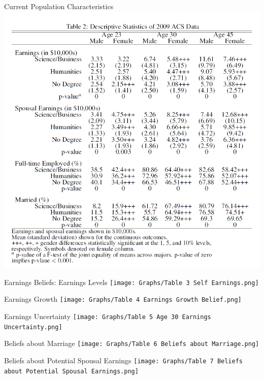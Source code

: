 \documentclass[12pt]{beamer}
\begin{document}
\begin{frame}{Current Population Characteristics}
    \includegraphics[scale=0.4]{Table2.png}
\end{frame}

\begin{frame}{Earnings Beliefs: Earnings Levels}
    \texttt{[image: Graphs/Table 3 Self Earnings.png]}
\end{frame}

\begin{frame}{Earnings Growth}
    \texttt{[image: Graphs/Table 4 Earnings Growth Belief.png]}
\end{frame}

\begin{frame}{Earnings Uncertainty}
    \texttt{[image: Graphs/Table 5 Age 30 Earnings Uncertainty.png]}
\end{frame}

\begin{frame}{Beliefs about Marriage}
    \texttt{[image: Graphs/Table 6 Beliefs about Marriage.png]}
\end{frame}

\begin{frame}{Beliefs about Potential Spousal Earnings}
    \texttt{[image: Graphs/Table 7 Beliefs about Potential Spousal Earnings.png]}
\end{frame}
\end{document}
